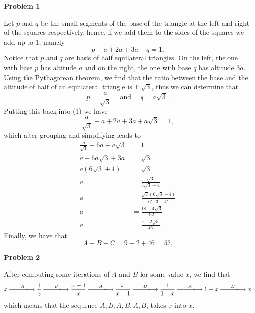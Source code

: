 \documentclass[a4paper,12pt]{article}
\begin{document}
	\newpage %

	{\bf Problem 1}
	
	Let $p$ and $q$ be the small segments of the  base of the triangle at the left and right of the squares respectively, hence, if we add them to the sides of the squares we add up to 1, namely
	\begin{equation}p+a+2a+3a+q=1.\end{equation}
	Notice that $p$ and $q$ are basis of half equilateral triangles. On the left, the one with base $p$ has altitude $a$ and on the right, the one with base $q$ has altitude $3a$. Using the Pythagorean theorem, we find that the ratio between the base and the altitude of half of an equilateral triangle is $1:\sqrt{3}$, thus we can determine that 
	$$p=\frac{a}{\sqrt{3}}\quad\text{ and }\quad q=a\sqrt{3}.$$
	Putting this back into (1) we have
	\begin{equation}\frac{a}{\sqrt{3}}+a+2a+3a+a\sqrt{3}=1,\end{equation}
	which after grouping and simplifying leads to
	\begin{align*}
		\frac{a}{\sqrt{3}}+6a+a\sqrt{3}&=1\\
		a+6a\sqrt{3}+3a&=\sqrt{3}\\
		a(6\sqrt{3}+4)&=\sqrt{3}\\
		a&=\frac{\sqrt{3}}{6\sqrt{3}+4}\\
		a&=\frac{\sqrt{3}(6\sqrt{3}-4)}{6^2\cdot3-4^2}\\
		a&=\frac{18-4\sqrt{3}}{92}\\
		a&=\frac{9-2\sqrt{3}}{46}.
	\end{align*}
	Finally, we have that
	$$A+B+C=9-2+46=53.$$
	
	{\bf Problem 2}
	
	After computing some iterations of $A$ and $B$ for some value $x$, we find that
	$$x\stackrel{A}{\raisebox{0.58ex}{\rule{1cm}{0.4pt}}\hspace{-.2cm}\longrightarrow}\frac1x\stackrel{B}{\raisebox{0.58ex}{\rule{1cm}{0.4pt}}\hspace{-.2cm}\longrightarrow}\frac{x-1}{x}\stackrel{A}{\raisebox{0.58ex}{\rule{1cm}{0.4pt}}\hspace{-.2cm}\longrightarrow}\frac{x}{x-1}\stackrel{B}{\raisebox{0.58ex}{\rule{1cm}{0.4pt}}\hspace{-.2cm}\longrightarrow}\frac{1}{1-x}\stackrel{A}{\raisebox{0.58ex}{\rule{1cm}{0.4pt}}\hspace{-.2cm}\longrightarrow}1-x\stackrel{B}{\raisebox{0.58ex}{\rule{1cm}{0.4pt}}\hspace{-.2cm}\longrightarrow}x$$
	which means that the sequence $A,B,A,B,A,B$, takes $x$ into $x$.
	
\end{document}

